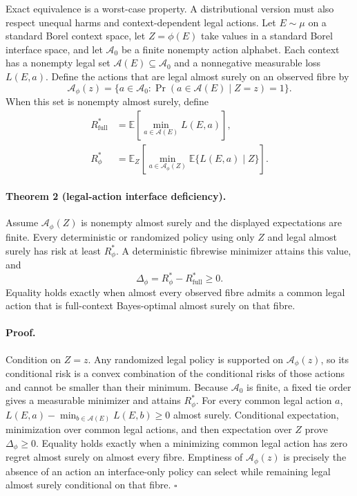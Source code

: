 Exact equivalence is a worst-case property. A distributional version must
also respect unequal harms and context-dependent legal actions. Let $E\sim\mu$
on a standard Borel context space, let $Z=\phi(E)$ take values in a standard
Borel interface space, and let $\mathcal A_0$ be a finite nonempty action
alphabet. Each context has a nonempty legal set $\mathcal A(E)\subseteq
\mathcal A_0$ and a nonnegative measurable loss $L(E,a)$. Define the actions
that are legal almost surely on an observed fibre by
\[
 \mathcal A_\phi(z)=
 \{a\in\mathcal A_0:\Pr(a\in\mathcal A(E)\mid Z=z)=1\}.
\]
When this set is nonempty almost surely, define
\begin{align*}
 R_{\mathrm{full}}^*
 &=\mathbb E\!\left[\min_{a\in\mathcal A(E)}L(E,a)\right],\\
 R_\phi^*
 &=\mathbb E_Z\!\left[
   \min_{a\in\mathcal A_\phi(Z)}
   \mathbb E\{L(E,a)\mid Z\}
 \right].
\end{align*}

\paragraph{Theorem 2 (legal-action interface deficiency).}
Assume $\mathcal A_\phi(Z)$ is nonempty almost surely and the displayed
expectations are finite. Every deterministic or
randomized policy using only $Z$ and legal almost surely has risk at least
$R_\phi^*$. A deterministic fibrewise minimizer attains this value, and
\[
 \Delta_\phi=R_\phi^*-R_{\mathrm{full}}^*\geq 0.
\]
Equality holds exactly when almost every observed fibre admits a common legal
action that is full-context Bayes-optimal almost surely on that fibre.

\paragraph{Proof.}
Condition on $Z=z$. Any randomized legal policy is supported on
$\mathcal A_\phi(z)$, so its conditional risk is a convex combination of the
conditional risks of those actions and cannot be smaller than their minimum.
Because $\mathcal A_0$ is finite, a fixed tie order gives a measurable
minimizer and attains $R_\phi^*$. For every common legal action $a$,
$L(E,a)-\min_{b\in\mathcal A(E)}L(E,b)\geq0$ almost surely. Conditional
expectation, minimization over common legal actions, and then expectation over
$Z$ prove $\Delta_\phi\geq0$. Equality holds exactly when a minimizing common
legal action has zero regret almost surely on almost every fibre. Emptiness of
$\mathcal A_\phi(z)$ is precisely the absence of an action an interface-only
policy can select while remaining legal almost surely conditional on that
fibre.
\hfill$\square$

